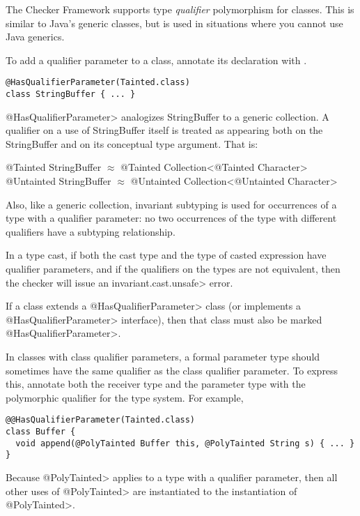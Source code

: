 
The Checker Framework supports type \emph{qualifier} polymorphism for classes.  This is similar to
Java's generic classes, but is used in situations where you cannot use Java generics.

To add a qualifier parameter to a class, annotate its declaration with .

\begin{Verbatim}
@HasQualifierParameter(Tainted.class)
class StringBuffer { ... }
\end{Verbatim}

\<@HasQualifierParameter> analogizes StringBuffer to a
generic collection.  A qualifier on a use of StringBuffer itself is treated as
appearing both on the StringBuffer and on its conceptual type argument.  That
is:\\
\begin{tt}
  @Tainted StringBuffer $\approx$ @Tainted Collection<@Tainted Character>\\
  @Untainted StringBuffer $\approx$ @Untainted Collection<@Untainted Character>
\end{tt}

Also, like a generic collection, invariant subtyping is used for occurrences of
a type with a qualifier parameter:  no two occurrences of the type with
different qualifiers have a subtyping relationship.

In a type cast, if both the cast type and the type of casted expression have
qualifier parameters, and if the qualifiers on the types are not equivalent,
then the checker will issue an \<invariant.cast.unsafe> error.

If a class extends a \<@HasQualifierParameter> class (or implements a
\<@HasQualifierParameter> interface), then that class must also be marked
\<@HasQualifierParameter>.


In classes with class qualifier parameters, a formal parameter type should
sometimes have the same qualifier as the class qualifier parameter.  To express
this, annotate both the receiver type and the parameter type with the
polymorphic qualifier for the type system. For example,
\begin{Verbatim}
@@HasQualifierParameter(Tainted.class)
class Buffer {
  void append(@PolyTainted Buffer this, @PolyTainted String s) { ... }
}
\end{Verbatim}
Because \<@PolyTainted> applies to a type with a qualifier parameter, then all
other uses of \<@PolyTainted> are instantiated to the instantiation of
\<@PolyTainted>.

